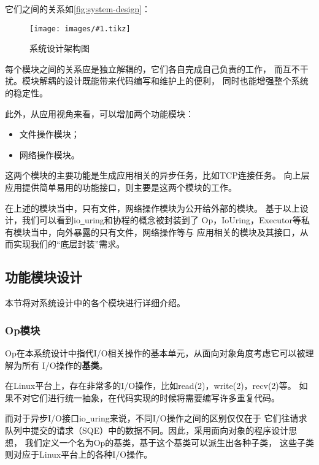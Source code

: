 \documentclass[supercite]{HustGraduPaper}
\newcommand{\cfig}[3]{
  \begin{figure}[htb]
    \centering
    \texttt{[image: images/\#1.tikz]}
    \caption{#3}
    \label{fig:#1}
  \end{figure}
}
\newcommand{\rfig}[1]{\autoref{fig:#1}}
\theoremstyle{definition}
\begin{document}
它们之间的关系如\rfig{system-design}：\par

\cfig{system-design}{0.9}{系统设计架构图}

每个模块之间的关系应是独立解耦的，它们各自完成自己负责的工作，
而互不干扰。模块解耦的设计既能带来代码编写和维护上的便利，
同时也能增强整个系统的稳定性。\par

此外，从应用视角来看，可以增加两个功能模块：

\begin{itemize}
  \item 文件操作模块；
  \item 网络操作模块。
\end{itemize}

这两个模块的主要功能是生成应用相关的异步任务，比如TCP连接任务。
向上层应用提供简单易用的功能接口，则主要是这两个模块的工作。\par

在上述的模块当中，只有文件，网络操作模块为公开给外部的模块。
基于以上设计，我们可以看到io\underline{~}uring和协程的概念被封装到了
Op，IoUring，Executor等私有模块当中，向外暴露的只有文件，网络操作等与
应用相关的模块及其接口，从而实现我们的“底层封装”需求。\par

\subsection{功能模块设计}
本节将对系统设计中的各个模块进行详细介绍。\par

\subsubsection{Op模块}

Op在本系统设计中指代I/O相关操作的基本单元，从面向对象角度考虑它可以被理解为所有
I/O操作的\textbf{基类}。\par

在Linux平台上，存在非常多的I/O操作，比如read(2)，write(2)，recv(2)等。
如果不对它们进行统一抽象，在代码实现的时候将需要编写许多重复代码。\par

而对于异步I/O接口io\underline{~}uring来说，不同I/O操作之间的区别仅仅在于
它们往请求队列中提交的请求（SQE）中的数据不同。因此，采用面向对象的程序设计思想，
我们定义一个名为Op的基类，基于这个基类可以派生出各种子类，
这些子类则对应于Linux平台上的各种I/O操作。\par
\end{document}
